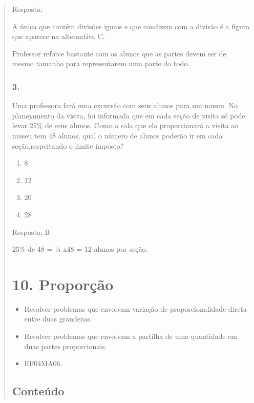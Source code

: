 \begin{enumerate}
\begin{escolha}
\begin{enumerate}
\begin{itemize}
\begin{itemize}
\begin{escolha}
\begin{quote}
\begin{escolha}
{Resposta:

A única que contêm divisões iguais e que condizem com a divisão é a
figura que aparece na alternativa C.

Professor reforce bastante com os alunos que as partes devem ser de
mesmo tamanho para representarem uma parte do todo.

\subsubsection{3.}\label{section-116}

Uma professora fará uma excursão com seus alunos para um museu. No
planejamento da visita, foi informada que em cada seção de visita só
pode levar 25\% de seus alunos. Como a sala que ela proporcionará a
visita ao museu tem 48 alunos, qual o número de alunos poderão ir em
cada seção,respeitando o limite imposto?

\begin{enumerate}
\def\labelenumi{\alph{enumi})}
\item
  8
\item
  12
\item
  20
\item
  28
\end{enumerate}

Resposta: B

25\% de 48 = ¼ x48 = 12 alunos por seção.

\section{10. Proporção}\label{muxf3dulo-10}


\begin{itemize}
\item Resolver problemas que envolvam variação de proporcionalidade direta
entre duas grandezas.
\item Resolver problemas que envolvam a partilha de uma quantidade em duas
partes proporcionais.
\end{itemize}


\begin{itemize}
\item EF04MA06.
\end{itemize}

\subsection{Conteúdo}\label{conteuxfado-9}

}
\end{escolha}
\end{quote}
\end{escolha}
\end{itemize}
\end{itemize}
\end{enumerate}
\end{escolha}
\end{enumerate}
